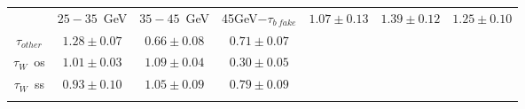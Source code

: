 \centering
\begin{tabular}{|c|c|c|c|} \toprule\toprule
 & $25-35$~GeV & $35-45$~GeV & 45GeV$-$$\tau_{b~fake}$ & $1.07\pm0.13$ & $1.39\pm0.12$ & $1.25\pm0.10$\\
$\tau_{other}$ & $1.28\pm0.07$ & $0.66\pm0.08$ & $0.71\pm0.07$\\
$\tau_{W}$~os & $1.01\pm0.03$ & $1.09\pm0.04$ & $0.30\pm0.05$\\
$\tau_{W}$~ss & $0.93\pm0.10$ & $1.05\pm0.09$ & $0.79\pm0.09$\\
\bottomrule\bottomrule\\
\end{tabular}

